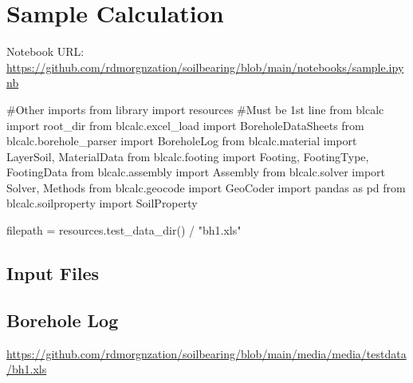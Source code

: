 \chapter{Sample Calculation}
Notebook URL: \url{https://github.com/rdmorgnzation/soilbearing/blob/main/notebooks/sample.ipynb}\\

\begin{python}
#Other imports from library
import resources #Must be 1st line
from blcalc import root_dir
from blcalc.excel_load import BoreholeDataSheets
from blcalc.borehole_parser import BoreholeLog
from blcalc.material import LayerSoil, MaterialData
from blcalc.footing import Footing, FootingType, FootingData
from blcalc.assembly import Assembly
from blcalc.solver import Solver, Methods
from blcalc.geocode import GeoCoder
import pandas as pd
from blcalc.soilproperty import SoilProperty
\end{python}

\begin{python}
filepath = resources.test_data_dir() / "bh1.xls"
\end{python}

\section{Input Files}

\section{Borehole Log}
\url{https://github.com/rdmorgnzation/soilbearing/blob/main/media/media/testdata/bh1.xls}\\

